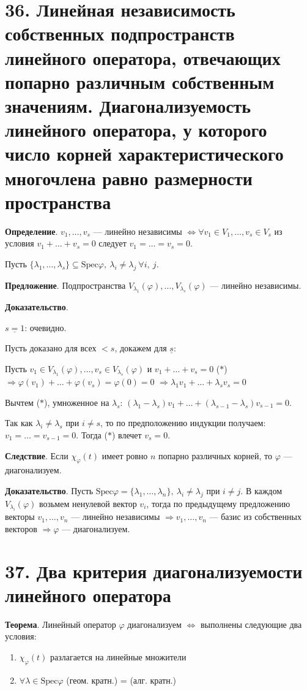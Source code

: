 \documentclass[a4paper, 12pt]{article}
\begin{document}
\section*{36. Линейная независимость собственных подпространств линейного оператора, отвечающих попарно различным собственным значениям. Диагонализуемость линейного оператора, у которого число корней характеристического многочлена равно размерности пространства}

\textbf{Определение}. $v_1, \ldots, v_s$ --- линейно независимы $\Longleftrightarrow \forall v_1 \in V_1, \ldots, v_s \in V_s$ из условия $v_1 + \ldots + v_s = 0$ следует $v_1 = \ldots = v_s = 0$.

\vspace{5mm}
Пусть $\{\lambda_1, \ldots, \lambda_s\} \subseteq \text{Spec}\varphi,\ \lambda_i \neq \lambda_j\ \forall i,\ j$.

\textbf{Предложение}. Подпространства $V_{\lambda_1}(\varphi), \ldots, V_{\lambda_s}(\varphi)$ --- линейно независимы.

\textbf{Доказательство}. 

$\underline{s = 1}$: очевидно.

Пусть доказано для всех $< s$, докажем для $\underline{s}$:

Пусть $v_1 \in V_{\lambda_1}(\varphi), \ldots, v_s \in V_{\lambda_s}(\varphi)$ и $v_1 + \ldots + v_s = 0$ ($*$) $\Longrightarrow \varphi(v_1) + \ldots + \varphi(v_s) = \varphi(0) = 0$ $\Longrightarrow \lambda_1v_1 + \ldots + \lambda_sv_s = 0$

Вычтем ($*$), умноженное на $\lambda_s$: $(\lambda_1 - \lambda_s)v_1 + \ldots + (\lambda_{s - 1} - \lambda_s)v_{s - 1} = 0$.

Так как $\lambda_i \neq \lambda_s$ при $i \neq s$, то по предположению индукции получаем: $v_1 = \ldots = v_{s - 1} = 0$. Тогда ($*$) влечет $v_s = 0$.

\vspace{5mm}
\textbf{Следствие}. Если $\chi_\varphi(t)$ имеет ровно $n$ попарно различных корней, то $\varphi$ --- диагонализуем.

\textbf{Доказательство}. Пусть $\text{Spec}\varphi = \{\lambda_1, \ldots, \lambda_n\},\ \lambda_i \neq \lambda_j$ при $i \neq j$. В каждом $V_{\lambda_i}(\varphi)$ возьмем ненулевой вектор $v_i$, тогда по предыдущему предложению векторы $v_1, \ldots, v_n$ --- линейно независимы $\Longrightarrow v_1, \ldots, v_n$ --- базис из собственных векторов $\Longrightarrow \varphi$ --- диагонализуем.

\section*{37. Два критерия диагонализуемости линейного оператора}
\textbf{Теорема}. Линейный оператор $\varphi$ диагонализуем $\Longleftrightarrow$ выполнены следующие два условия:
\vspace{-3mm}
\begin{enumerate}
    \itemsep=0em
    \item $\chi_\varphi(t)$ разлагается на линейные множители
    \item $\forall \lambda \in \text{Spec}\varphi$ (геом. кратн.) = (алг. кратн.)
\end{enumerate}
\end{document}
